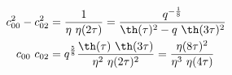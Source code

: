 \begin{equation}
  \begin{split}
     c_{00}^2 - c_{02}^2 &= {1\over \eta ~\eta(2\tau)} ={ q^{-{1\over
     8}} \over \th(\tau)^2 -q~\th(3\tau)^2} \\
      c_{00}~ c_{02} &= q^{5\over 8} {\th(\tau)~\th(3\tau) \over
     \eta^2 ~\eta(2\tau)^2} = {\eta(8\tau)^2 \over \eta^3 ~\eta(4\tau)}
  \end{split}
\end{equation}

